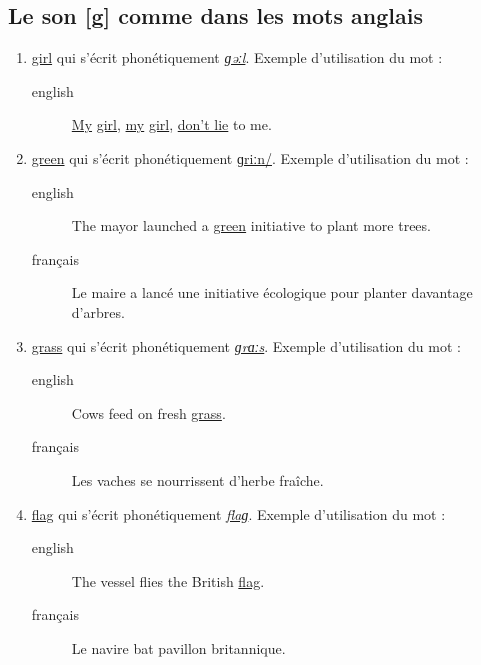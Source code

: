 \documentclass[12pt,a4paper]{book}
\begin{document}
\subsection{Le son [g] comme dans les mots anglais}
\label{sec:orgf88a6b3}
\begin{enumerate}
\item \href{http://www.wordreference.com/enfr/girl}{girl} qui s'écrit phonétiquement \href{https://en.oxforddictionaries.com/definition/girl}{\emph{ɡəːl}}. Exemple d'utilisation du mot :
\begin{description}
\item[{english}] \textenglish{\href{https://en.wikipedia.org/wiki/In\_the\_Pines}{My}
\href{https://youtu.be/bpFuH8vcXbw}{girl},
\href{https://genius.com/Nirvana-where-did-you-sleep-last-night-lyrics}{my}
\href{https://youtu.be/PsfcUZBMSSg}{girl},
\href{https://fr.wikipedia.org/wiki/Where\_Did\_You\_Sleep\_Last\_Night}{don't
lie} to me.}
\end{description}
\item \href{http://www.wordreference.com/enfr/green}{green} qui s'écrit phonétiquement \href{https://en.oxforddictionaries.com/definition/green}{ɡriːn/}. Exemple d'utilisation du mot :
\begin{description}
\item[{english}] \textenglish{The mayor launched a \href{https://youtu.be/a1BS7XnEZqc}{green} initiative to plant more
trees.}
\item[{français}] Le maire a lancé une initiative écologique pour
planter davantage d'arbres.
\end{description}
\item \href{http://www.wordreference.com/enfr/grass}{grass} qui s'écrit phonétiquement \href{https://en.oxforddictionaries.com/definition/grass}{\emph{ɡrɑːs}}. Exemple d'utilisation du mot :
\begin{description}
\item[{english}] \textenglish{Cows feed on fresh \href{https://youtu.be/QsfJscoMx5M}{grass}.}
\item[{français}] Les vaches se nourrissent d'herbe fraîche.
\end{description}
\item \href{http://www.wordreference.com/enfr/flag}{flag} qui s'écrit phonétiquement \href{https://en.oxforddictionaries.com/definition/flag}{\emph{flaɡ}}. Exemple d'utilisation du mot :
\begin{description}
\item[{english}] \textenglish{The vessel flies the British \href{https://youtu.be/EBl2PVjVNqA}{flag}.}
\item[{français}] Le navire bat pavillon britannique.
\end{description}
\end{enumerate}
\end{document}
